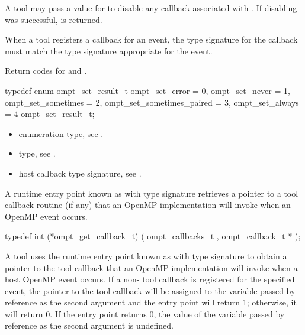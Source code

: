 A tool may pass a  value for  to disable
any callback associated with . If disabling was successful,
 is returned.

\constraints
When a tool registers a callback for an event, the type
signature for the callback must match the type signature appropriate for the
event.

\begin{table}
\caption{Return codes for  and
    .\label{table:ToolsSupport_set_rc}}
\begin{omptEnum}
typedef enum ompt_set_result_t {
  ompt_set_error            = 0,
  ompt_set_never            = 1,
  ompt_set_sometimes        = 2,
  ompt_set_sometimes_paired = 3,
  ompt_set_always           = 4
} ompt_set_result_t;
\end{omptEnum}
\vspace*{1ex}
\end{table}

\crossreferences
\begin{itemize}
\item {} enumeration type, see .
\item {} type, see .
\item {} host callback type signature,
see .
\end{itemize}

\label{sec:ompt_get_callback_t}
\label{sec:ompt_get_callback}

\summary

A runtime entry point known as 
with type signature  retrieves a pointer
to a tool callback routine (if any)
that an OpenMP implementation will invoke when an OpenMP event occurs.

\format

\begin{ccppspecific}
\begin{omptCallback}
typedef int (*ompt_get_callback_t) (
  ompt_callbacks_t ,
  ompt_callback_t *
);
\end{omptCallback}
\end{ccppspecific}


\descr
A tool uses the runtime entry point known
as 
with type signature 
to obtain a pointer to the tool callback that
an OpenMP implementation will invoke when a host OpenMP event occurs.
If a non- tool callback is registered for the specified event,
the pointer to the tool callback will be assigned to the variable
passed by reference as the second argument and the entry
point will return 1; otherwise, it will return 0. If the entry point
returns 0, the value of the variable passed by reference as the second
argument is undefined.

